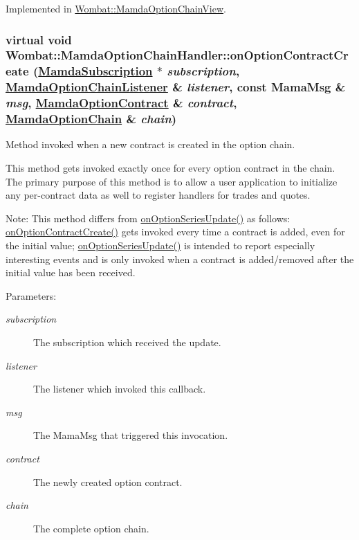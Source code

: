 Implemented in \hyperlink{classWombat_1_1MamdaOptionChainView_462b2193ed1b852f15859742008dd5b7}{Wombat::Mamda\-Option\-Chain\-View}.\hypertarget{classWombat_1_1MamdaOptionChainHandler_a3cfccdc231b70111443aa096cf9a606}{
\subsubsection[onOptionContractCreate]{\setlength{\rightskip}{0pt plus 5cm}virtual void Wombat::Mamda\-Option\-Chain\-Handler::on\-Option\-Contract\-Create (\hyperlink{classWombat_1_1MamdaSubscription}{Mamda\-Subscription} $\ast$ {\em subscription}, \hyperlink{classWombat_1_1MamdaOptionChainListener}{Mamda\-Option\-Chain\-Listener} \& {\em listener}, const Mama\-Msg \& {\em msg}, \hyperlink{classWombat_1_1MamdaOptionContract}{Mamda\-Option\-Contract} \& {\em contract}, \hyperlink{classWombat_1_1MamdaOptionChain}{Mamda\-Option\-Chain} \& {\em chain})}}
\label{classWombat_1_1MamdaOptionChainHandler_a3cfccdc231b70111443aa096cf9a606}


Method invoked when a new contract is created in the option chain. 

This method gets invoked exactly once for every option contract in the chain. The primary purpose of this method is to allow a user application to initialize any per-contract data as well to register handlers for trades and quotes.

Note: This method differs from \hyperlink{classWombat_1_1MamdaOptionChainHandler_0f2ed7a5229483349b2c26330a0afb03}{on\-Option\-Series\-Update()} as follows: \hyperlink{classWombat_1_1MamdaOptionChainHandler_a3cfccdc231b70111443aa096cf9a606}{on\-Option\-Contract\-Create()} gets invoked every time a contract is added, even for the initial value; \hyperlink{classWombat_1_1MamdaOptionChainHandler_0f2ed7a5229483349b2c26330a0afb03}{on\-Option\-Series\-Update()} is intended to report especially interesting events and is only invoked when a contract is added/removed after the initial value has been received.

\begin{Desc}
\item[Parameters:]
\begin{description}
\item[{\em subscription}]The subscription which received the update. \item[{\em listener}]The listener which invoked this callback. \item[{\em msg}]The Mama\-Msg that triggered this invocation. \item[{\em contract}]The newly created option contract. \item[{\em chain}]The complete option chain. \end{description}
\end{Desc}


